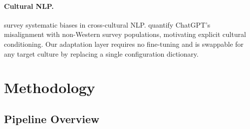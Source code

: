 \documentclass[11pt]{article}
\begin{document}
\paragraph{Cultural NLP.}
\citet{hershcovich2022challenges} survey systematic biases in cross-cultural NLP.
\citet{cao2023assessing} quantify ChatGPT's misalignment with non-Western
survey populations, motivating explicit cultural conditioning.
Our adaptation layer requires no fine-tuning and is swappable for any target
culture by replacing a single configuration dictionary.

\section{Methodology}

\subsection{Pipeline Overview}
\end{document}
